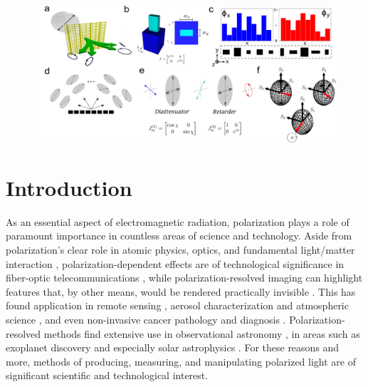\documentclass[footinbib,aps,prl,twocolumn,superscriptaddress]{revtex4-1}
\begin{document}

\maketitle


\begin{figure}[!htp]
	\centering
	\includegraphics[width=\textwidth]{Fig1.pdf}
	\caption{\label{fig:fig1}}
\end{figure}

\section{Introduction}

As an essential aspect of electromagnetic radiation, polarization plays a role of paramount importance in countless areas of science and technology. Aside from polarization's clear role in atomic physics, optics, and fundamental light/matter interaction \cite{Born1999a}, polarization-dependent effects are of technological significance in fiber-optic telecommunications \cite{Damask2005, Yariv2006}, while polarization-resolved imaging can highlight features that, by other means, would be rendered practically invisible \cite{Tyo2006, Snik2014}. This has found application in remote sensing \cite{Tyo2006}, aerosol characterization and atmospheric science \cite{Deschamps1994}, and even non-invasive cancer pathology and diagnosis \cite{Novikova2012, Pierangelo2013}. Polarization-resolved methods find extensive use in observational astronomy \cite{Keller2001}, in areas such as exoplanet discovery \cite{Wiktorowicz2014} and especially solar astrophysics \cite{Stenflo1994}. For these reasons and more, methods of producing, measuring, and manipulating polarized light are of significant scientific and technological interest.
\end{document}
